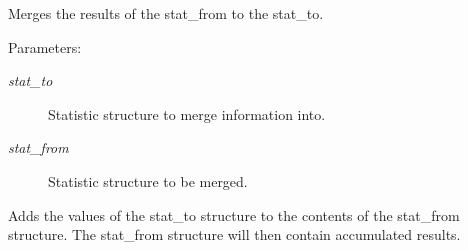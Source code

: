 Merges the results of the stat\_\-from to the stat\_\-to.

\begin{Desc}
\item[Parameters: ]\par
\begin{description}
\item[{\em 
stat\_\-to}]Statistic structure to merge information into. \item[{\em 
stat\_\-from}]Statistic structure to be merged.\end{description}
\end{Desc}
Adds the values of the stat\_\-to structure to the contents of the stat\_\-from structure. The stat\_\-from structure will then contain accumulated results. 